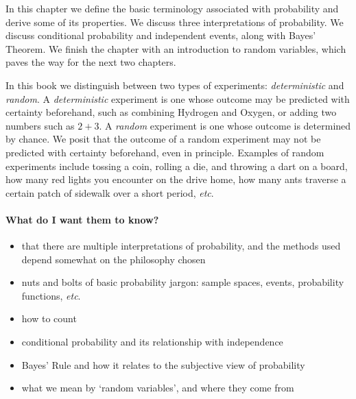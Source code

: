 \documentclass[captions=tableheading]{scrbook}
\begin{document}
\noindent 
In this chapter we define the basic terminology associated with probability and derive some of its properties. We discuss three interpretations of probability. We discuss conditional probability and independent events, along with Bayes' Theorem. We finish the chapter with an introduction to random variables, which paves the way for the next two chapters.

In this book we distinguish between two types of experiments: \emph{deterministic} and \emph{random}. A \emph{deterministic} experiment is one whose outcome may be predicted with certainty beforehand, such as combining Hydrogen and Oxygen, or adding two numbers such as \(2+3\). A \emph{random} experiment is one whose outcome is determined by chance. We posit that the outcome of a random experiment may not be predicted with certainty beforehand, even in principle. Examples of random experiments include tossing a coin, rolling a die, and throwing a dart on a board, how many red lights you encounter on the drive home, how many ants traverse a certain patch of sidewalk over a short period, \emph{etc}.

\paragraph*{What do I want them to know?}

\begin{itemize}
\item that there are multiple interpretations of probability, and the methods used depend somewhat on the philosophy chosen
\item nuts and bolts of basic probability jargon: sample spaces, events, probability functions, \emph{etc}.
\item how to count
\item conditional probability and its relationship with independence
\item Bayes' Rule and how it relates to the subjective view of probability
\item what we mean by `random variables', and where they come from
\end{itemize}
\end{document}
